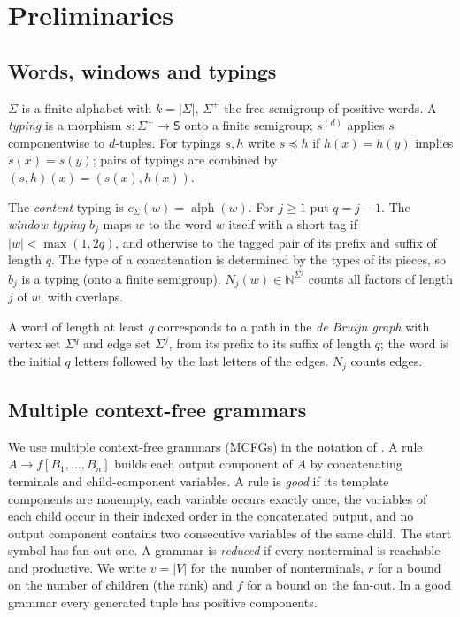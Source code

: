 \documentclass[11pt]{article}
\numberwithin{equation}{section}
\theoremstyle{plain}
\theoremstyle{definition}
\theoremstyle{remark}
\theoremstyle{plain}
\newcommand{\alphset}{\operatorname{alph}}
\begin{document}
\section{Preliminaries}
\label{sec:prelim}

\subsection{Words, windows and typings}

$\Sigma$ is a finite alphabet with $k=|\Sigma|$, $\Sigma^+$ the free semigroup of
positive words.  A \emph{typing} is a morphism $s:\Sigma^+\to\mathsf S$ onto a
finite semigroup; $s^{(d)}$ applies $s$ componentwise to $d$-tuples.  For
typings $s,h$ write $s\preceq h$ if $h(x)=h(y)$ implies $s(x)=s(y)$; pairs of
typings are combined by $(s,h)(x)=(s(x),h(x))$.

The \emph{content} typing is $c_\Sigma(w)=\alphset(w)$.  For $j\ge1$ put $q=j-1$.
The \emph{window typing} $b_j$ maps $w$ to the word $w$ itself with a short tag
if $|w|<\max(1,2q)$, and otherwise to the tagged pair of its prefix and suffix
of length $q$.  The type of a concatenation is determined by the types of its
pieces, so $b_j$ is a typing (onto a finite semigroup).  $N_j(w)\in\mathbb
N^{\Sigma^j}$ counts all factors of length $j$ of $w$, with overlaps.

A word of length at least $q$ corresponds to a path in the \emph{de Bruijn
graph} with vertex set $\Sigma^q$ and edge set $\Sigma^j$, from its prefix to
its suffix of length $q$; the word is the initial $q$ letters followed by the
last letters of the edges.  $N_j$ counts edges.

\subsection{Multiple context-free grammars}

We use multiple context-free grammars (MCFGs) \cite{SekiEtAl1991} in the
notation of \cite{Yoshinaka2011}.  A rule $A\to f[B_1,\ldots,B_n]$ builds each
output component of $A$ by concatenating terminals and child-component
variables.  A rule is \emph{good} if its template components are nonempty, each
variable occurs exactly once, the variables of each child occur in their
indexed order in the concatenated output, and no output component contains two
consecutive variables of the same child.  The start symbol has fan-out one.  A
grammar is \emph{reduced} if every nonterminal is reachable and productive.  We
write $v=|V|$ for the number of nonterminals, $r$ for a bound on the number of
children (the rank) and $f$ for a bound on the fan-out.  In a good grammar
every generated tuple has positive components.
\end{document}
